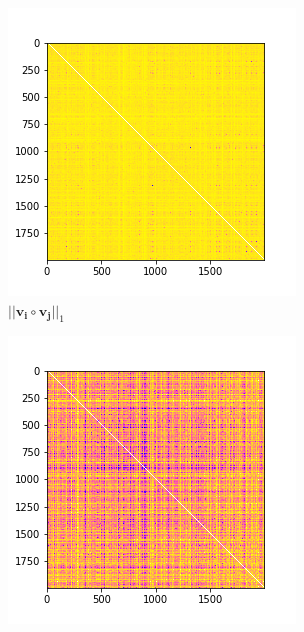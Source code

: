 \documentclass[10pt,a4paper, nocenter]{report}
\begin{document}
\begin{enumerate}
        \begin{figure}[h]
            \begin{center}
                \begin{subfigure}[b]{0.3\textwidth}
                    \centering
                    \includegraphics[width=\textwidth]{../../images/w_0norm.png}
                    \caption{$\lvert \lvert \mathbf{v_i} \circ \mathbf{v_j} \rvert \rvert_1$ \vspace{10pt} }
                    \label{fig:w_0norm}
                \end{subfigure}           
                \begin{subfigure}[b]{0.3\textwidth}
                    \centering
                    \includegraphics[width=\textwidth]{../../images/w_2norm.png}

\end{subfigure}
\end{center}
\end{figure}
\end{enumerate}
\end{document}
